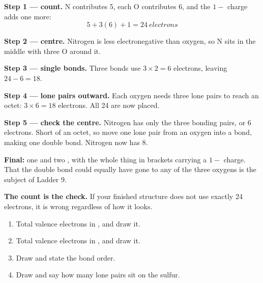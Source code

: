 \documentclass{apchem-worksheet}
\begin{document}
\begin{workedexample}
\textbf{Step 1 --- count.} N contributes 5, each O contributes 6, and the
$1-$ charge adds one more:
\[ 5 + 3(6) + 1 = \SI{24}{electrons} \]

\textbf{Step 2 --- centre.} Nitrogen is less electronegative than oxygen,
so N sits in the middle with three O around it.

\textbf{Step 3 --- single bonds.} Three  bonds use
$3 \times 2 = 6$ electrons, leaving $24 - 6 = 18$.

\textbf{Step 4 --- lone pairs outward.} Each oxygen needs three lone
pairs to reach an octet: $3 \times 6 = 18$ electrons. All 24 are now
placed.

\textbf{Step 5 --- check the centre.} Nitrogen has only the three
bonding pairs, or 6 electrons. Short of an octet, so move one lone pair
from an oxygen into a bond, making one  double bond. Nitrogen now
has 8.

\textbf{Final:} one  and two , with the whole thing in
brackets carrying a $1-$ charge. That the double bond could equally have
gone to any of the three oxygens is the subject of Ladder 9.

\textbf{The count is the check.} If your finished structure does not use
exactly 24 electrons, it is wrong regardless of how it looks.
\end{workedexample}

\begin{yourturn}
\begin{enumerate}[leftmargin=*,itemsep=0.5em]
  \item Total valence electrons in , and draw it.
        \workspace[1.8cm]
  \item Total valence electrons in , and draw it.
        \workspace[1.8cm]
  \item Draw  and state the bond order. \workspace[1.8cm]
  \item Draw  and say how many lone pairs sit on the sulfur.
        \workspace[1.8cm]
\end{enumerate}
\end{yourturn}
\end{document}
